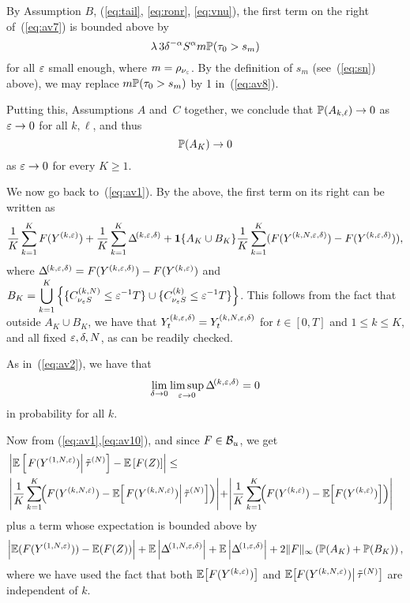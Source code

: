 By Assumption $B$, (\ref{eq:tail}, \ref{eq:ronr}, \ref{eq:vnu}),
the first term on the right of~(\ref{eq:av7}) is bounded above by
\begin{equation}
\label{eq:av8}
\lambda\, 3\d^{-\a} S^\a m\P(\tau_0>s_m)
\end{equation}
for all $\eps$ small enough, where $m=\rho_{\nu_\eps}$. By the definition of $s_m$ (see~(\ref{eq:sn}) above),
we may replace $m\P(\tau_0>s_m)$ by 1 in~(\ref{eq:av8}).

Putting this, Assumptions $A$ and~$C$ together, we conclude that $\P(A_{k,\ell})\to0$ as $\eps\to0$ for all $k,\ell$, and thus
\begin{equation}
\label{eq:av9}
\P(A_{K})\to0
\end{equation}
as $\eps\to0$ for every $K\geq1$.

We now go back to~(\ref{eq:av1}). By the above, the first term on its right can be written as
\begin{equation}
\label{eq:av10}
\frac1{K}\sum_{k=1}^{K}F(\yke)
+\frac1{K}\sum_{k=1}^{K}\rked
+\1\{A_K\cup B_K\}\frac1{K}\sum_{k=1}^{K}(F(\ykned)-F(\yked)),
\end{equation}
where
$\rked=F(\yked)-F(\yke)$ and
${\displaystyle B_K=\bigcup_{k=1}^K\left\{\{\ckn_{\nu_\eps S}\leq\eps^{-1}T\}\cup\{\ck_{\nu_\eps S}\leq\eps^{-1}T\}\right\}}$.
 This follows from the fact that outside $A_K\cup B_K$, we have that $\yked_t=\ykned_t$ for $t\in[0,T]$ and $1\leq k\leq K$, and 
all fixed $\eps,\delta,N$, as can be readily checked.

As in~(\ref{eq:av2}), we have that
\begin{equation}
\label{eq:av11}
\lim_{\d\to0}\limsup_{\eps\to0}\rked=0
\end{equation}
in probability for all $k$.

Now from (\ref{eq:av1},\ref{eq:av10}), and since  $F\in\B_u$, we get 
\begin{eqnarray}\nn
&\left|\esp\left[\left.F(\y1e)\right|\ttn\right]-\esp\left[F(Z)\right]\right|\leq&\\
&\left|\frac1{K}\sum_{k=1}^{K}\!\!\left(F(\ykne)-\esp\!\left[\left.F(\ykne)\right|\ttn\right]\right)\right|\!
+\!\left|\frac1{K}\sum_{k=1}^{K}\!\!\left(F(\yke)-\esp\!\left[F(\yke)\right]\right)\right|&
\label{eq:av12}
\end{eqnarray}
plus a term whose expectation is bounded above by 
\begin{equation}
\label{eq:av13}
\left|\esp(F(\y1e))-\esp(F(Z))\right|+\esp\left|\roned\right|+\esp\left|\r1ed\right|+2\|F\|_\infty\left(\P(A_K)+\P(B_K)\right),
\end{equation}
where we have used the fact that both $\esp\!\left[F(\yke)\right]$ and $\esp\!\left[\!\left.F(\ykne)\right|\ttn\right]$ are independent of $k$.

